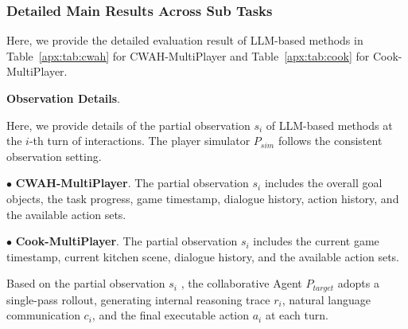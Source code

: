 \documentclass{article}
\theoremstyle{plain}
\theoremstyle{definition}
\theoremstyle{remark}
\begin{document}
\subsubsection{Detailed Main Results Across Sub Tasks}

Here, we provide the detailed evaluation result of LLM-based methods in Table~\ref{apx:tab:cwah} for CWAH-MultiPlayer and Table~\ref{apx:tab:cook} for Cook-MultiPlayer. 

\textbf{Observation Details}. 

Here, we provide details of the partial observation $s_i$ of LLM-based methods at the $i$-th turn of interactions. The player simulator $P_{sim}$ follows the consistent observation setting.

$\bullet$ \textbf{CWAH-MultiPlayer}. The partial observation $s_i$ includes the overall goal objects, the task progress, game timestamp, dialogue history, action history, and the available action sets.

$\bullet$ \textbf{Cook-MultiPlayer}. The partial observation $s_i$ includes the current game timestamp, current kitchen scene, dialogue history, and the available action sets.

Based on the partial observation $s_i$ , the collaborative Agent  $P_{target}$ adopts a single-pass rollout, generating internal reasoning trace $r_i$, natural language communication $c_i$, and the final executable action $a_i$ at each turn.
\end{document}
